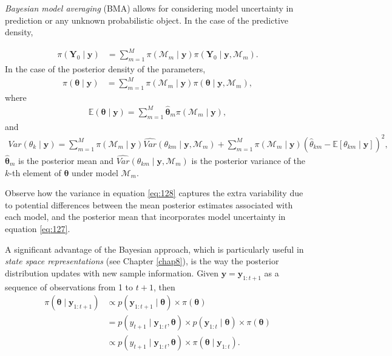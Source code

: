 \textit{Bayesian model averaging} (BMA) allows for considering model uncertainty in prediction or any unknown probabilistic object. In the case of the predictive density, 

\begin{align}
	\pi(\mathbf{Y}_0\mid \mathbf{y})&=\sum_{m=1}^M \pi(\mathcal{M}_m\mid \mathbf{y})\pi(\mathbf{Y}_0\mid \mathbf{y},\mathcal{M}_m).
\end{align}
In the case of the posterior density of the parameters,
\begin{align}
	\pi(\bm{\theta}\mid \mathbf{y})&=\sum_{m=1}^M \pi(\mathcal{M}_m\mid \mathbf{y})\pi(\bm{\theta}\mid \mathbf{y},\mathcal{M}_m),
\end{align}
where 
\begin{align}
	\mathbb{E}(\bm{\theta}\mid \mathbf{y})=\sum_{m=1}^{M}\hat{\bm{\theta}}_m \pi(\mathcal{M}_m\mid \mathbf{y}),
	\label{eq:127}
\end{align}
and
\begin{align}
	Var({\theta}_k\mid \mathbf{y})= \sum_{m=1}^{M}\pi(\mathcal{M}_m\mid \mathbf{y}) \widehat{Var} ({\theta}_{km}\mid \mathbf{y},\mathcal{M}_m)+\sum_{m=1}^{M} \pi(\mathcal{M}_m\mid \mathbf{y}) (\hat{{\theta}}_{km}-\mathbb{E}[{\theta}_{km}\mid \mathbf{y}])^2,
	\label{eq:128}
\end{align}
$\hat{\bm{\theta}}_m$ is the posterior mean and $\widehat{Var}({\theta}_{km}\mid \mathbf{y},\mathcal{M}_m)$ is the posterior variance of the $k$-th element of $\bm{\theta}$ under model $\mathcal{M}_m$.

Observe how the variance in equation \ref{eq:128} captures the extra variability due to potential differences between the mean posterior estimates associated with each model, and the posterior mean that incorporates model uncertainty in equation \ref{eq:127}.

A significant advantage of the Bayesian approach, which is particularly useful in \textit{state space representations} (see Chapter \ref{chap8}), is the way the posterior distribution updates with new sample information. Given $\mathbf{y} = \mathbf{y}_{1:t+1}$ as a sequence of observations from 1 to $t+1$, then
\begin{align}\label{equpdate}
	\pi(\bm{\theta}\mid \mathbf{y}_{1:t+1})&\propto p(\mathbf{y}_{1:t+1}\mid \bm{\theta})\times \pi(\bm{\theta})\nonumber\\
	&= p(y_{t+1}\mid \mathbf{y}_{1:t},\bm{\theta})\times p(\mathbf{y}_{1:t}\mid \bm{\theta})\times \pi(\bm{\theta})\nonumber\\
	&\propto p(y_{t+1}\mid \mathbf{y}_{1:t},\bm{\theta})\times \pi(\bm{\theta}\mid \mathbf{y}_{1:t}). 
\end{align}


